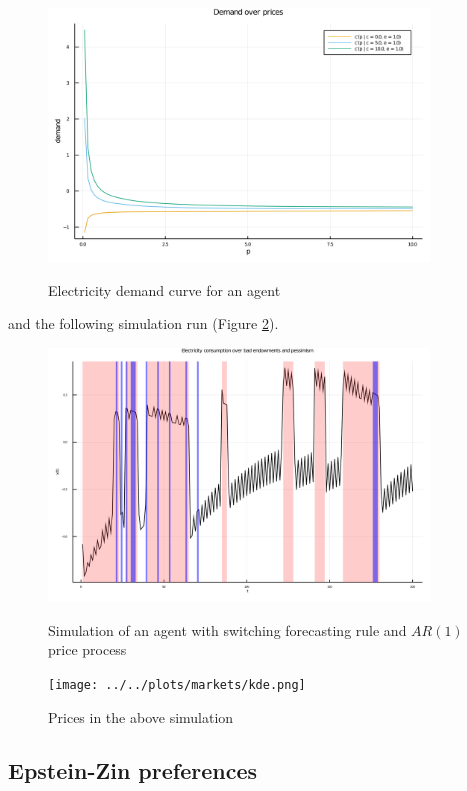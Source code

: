 \documentclass[american]{scrartcl}
\begin{document}
\begin{figure}[b]
    \centering
    \includegraphics[width=0.9\textwidth]{../../plots/markets/pricedemand.png}
    \label{fig:demand}
    \caption{Electricity demand curve for an agent}
\end{figure}

and the following simulation run (Figure \ref{fig:sim}).

\begin{figure}
    \centering
    \includegraphics[width=0.9\textwidth]{../../plots/markets/simul.png}
    \label{fig:sim}
    \caption{Simulation of an agent with switching forecasting rule and $AR(1)$ price process}
\end{figure}

\begin{figure}
    \centering
    \texttt{[image: ../../plots/markets/kde.png]}
    \label{fig:price}
    \caption{Prices in the above simulation}
\end{figure}

\iffalse
    \subsection{Epstein-Zin preferences}
\end{document}
